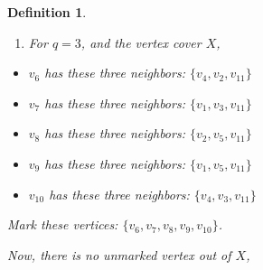 \documentclass[12pt]{article}
\theoremstyle{slplain}
\newtheorem{defi}{Definition}
\begin{document}
\begin{defi}
\begin{enumerate}
This kernel can be colored with $3$ and therefore with $4$ colors.

\vspace{1cm}

\begin{center}
\end{center}
\vspace{1cm}


If we consider set $Y$ as vertex cover, then only vertex $v_7$ is out of $Y$ and it doesn't have 4 neighbors in $Y$, hence no 
vertex will be marked and just $v_7$ will be removed, then the kernel is the set 
$\{v_1 , v_2 , v_3 , v_4 , v_5 , v_6 , v_8 , v_9 , v_{10} , v_{11}\}$ which is not as good, due to bigger kernel size.

\item For $q = 3$, and the vertex cover $X$,
\end{enumerate}

\begin{itemize}
\item $v_6$ has these three neighbors: $\{v_4 , v_2 , v_{11}\}$

\item $v_7$ has these three neighbors: $\{v_1 , v_3 , v_{11}\}$

\item $v_8$ has these three neighbors: $\{v_2 , v_5 , v_{11}\}$ 

\item $v_9$ has these three neighbors: $\{v_1 , v_5 , v_{11}\}$

\item $v_{10}$ has these three neighbors: $\{v_4 , v_3 , v_{11}\}$ 
\end{itemize}

Mark these vertices: $\{v_6, v_7, v_8, v_9, v_{10}\}$.


Now, there is no unmarked vertex out of $X$,


\end{defi}
\end{document}

